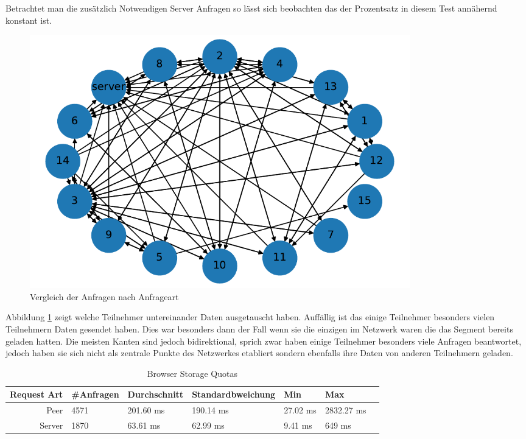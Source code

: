 Betrachtet man die zusätzlich Notwendigen Server Anfragen so lässt sich beobachten das der Prozentsatz in diesem Test annähernd konstant ist.  


\begin{figure}[!h]
	\centering
	\includegraphics[width=0.8\textwidth]{figures/15_clients_network}
	\caption[A Figure Short-Title]{Vergleich der Anfragen nach Anfrageart}
	\label{fig:15_clients_network}
\end{figure}

Abbildung \ref{fig:15_clients_network} zeigt welche Teilnehmer untereinander Daten ausgetauscht haben. Auffällig ist das einige Teilnehmer besonders vielen Teilnehmern Daten gesendet haben. Dies war besonders dann der Fall wenn sie die einzigen im Netzwerk waren die das Segment bereits geladen hatten. Die meisten Kanten sind jedoch bidirektional, sprich zwar haben einige Teilnehmer besonders viele Anfragen beantwortet, jedoch haben sie sich nicht als zentrale Punkte des Netzwerkes etabliert sondern ebenfalls ihre Daten von anderen Teilnehmern geladen.  

\begin{table}[!htb]
\begin{center}

	\begin{tabular}{|r|l|l|l|l|l|l|}
		\hline
		Request Art	 & #Anfragen 	& Durchschnitt 	& Standardbweichung	& Min		& Max	 \\ \hline
		Peer 		& 4571 				& 201.60	 ms	  	& 190.14	 ms				& 27.02 ms	& 2832.27 ms \\ \hline
		Server 		& 1870		 		& 63.61 ms		& 62.99	ms				& 9.41 ms	& 649 ms	\\
		\hline
	\end{tabular}
	\caption{Browser Storage Quotas }
\end{center}

\end{table}


